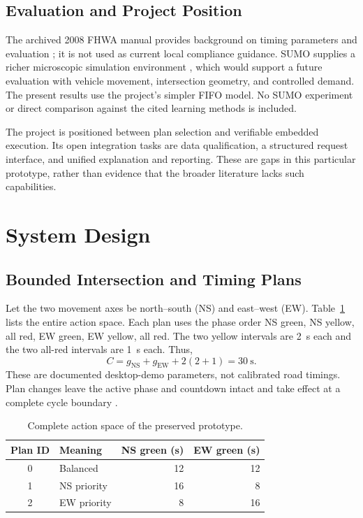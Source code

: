 \documentclass[conference]{IEEEtran}
\begin{document}
\subsection{Evaluation and Project Position}
The archived 2008 FHWA manual provides background on timing parameters and evaluation \cite{koonce2008timing}; it is not used as current local compliance guidance. SUMO supplies a richer microscopic simulation environment \cite{lopez2018sumo}, which would support a future evaluation with vehicle movement, intersection geometry, and controlled demand. The present results use the project's simpler FIFO model. No SUMO experiment or direct comparison against the cited learning methods is included.

The project is positioned between plan selection and verifiable embedded execution. Its open integration tasks are data qualification, a structured request interface, and unified explanation and reporting. These are gaps in this particular prototype, rather than evidence that the broader literature lacks such capabilities.

\section{System Design}
\subsection{Bounded Intersection and Timing Plans}
Let the two movement axes be north--south (NS) and east--west (EW). Table~\ref{tab:plans} lists the entire action space. Each plan uses the phase order NS green, NS yellow, all red, EW green, EW yellow, all red. The two yellow intervals are 2~s each and the two all-red intervals are 1~s each. Thus,
\begin{equation}
 C=g_{\mathrm{NS}}+g_{\mathrm{EW}}+2(2+1)=30\ \mathrm{s}.
\end{equation}
These are documented desktop-demo parameters, not calibrated road timings. Plan changes leave the active phase and countdown intact and take effect at a complete cycle boundary \cite{projectdesign}.

\begin{table}[t]
\caption{Complete action space of the preserved prototype.}
\label{tab:plans}
\centering
\begin{tabular}{clrr}
\toprule
Plan ID & Meaning & NS green (s) & EW green (s)\\
\midrule
0 & Balanced & 12 & 12\\
1 & NS priority & 16 & 8\\
2 & EW priority & 8 & 16\\
\bottomrule
\end{tabular}
\end{table}
\end{document}

